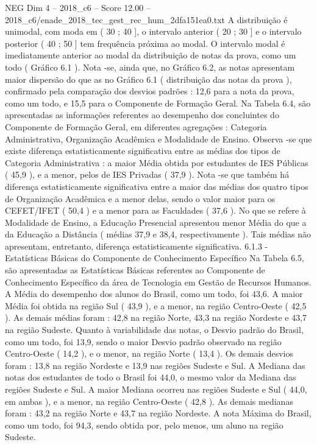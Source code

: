 \begin{textsample}{NEG Dim 4 – 2018\_c6 – Score 12.00 – 2018\_c6/enade\_2018\_tec\_gest\_rec\_hum\_2dfa151ea0.txt}
A distribuição é unimodal, com moda em ( 30 ; 40 ], o intervalo anterior ( 20 ; 30 ] e o intervalo posterior ( 40 ; 50 ] tem frequência próxima ao modal.
O intervalo modal é imediatamente anterior ao modal da distribuição de notas da prova, como um todo ( Gráfico 6.1 ).
Nota -se, ainda que, no Gráfico 6.2, as notas apresentam maior dispersão do que as no Gráfico 6.1 ( distribuição das notas da prova ), confirmado pela comparação dos desvios padrões : 12,6 para a nota da prova, como um todo, e 15,5 para o Componente de Formação Geral.
Na Tabela 6.4, são apresentadas as informações referentes ao desempenho dos concluintes do Componente de Formação Geral, em diferentes agregações : Categoria Administrativa, Organização Acadêmica e Modalidade de Ensino.
Observa -se que existe diferença estatisticamente significativa entre as médias dos tipos de Categoria Administrativa : a maior Média obtida por estudantes de IES Públicas ( 45,9 ), e a menor, pelos de IES Privadas ( 37,9 ).
Nota -se que também há diferença estatisticamente significativa entre a maior das médias dos quatro tipos de Organização Acadêmica e a menor delas, sendo o valor maior para os CEFET/IFET ( 50,4 ) e a menor para as Faculdades ( 37,6 ).
No que se refere à Modalidade de Ensino, a Educação Presencial apresentou menor Média do que a da Educação a Distância ( médias 37,9 e 38,4, respectivamente ).
Tais médias não apresentam, entretanto, diferença estatisticamente significativa. 6.1.3 - Estatísticas Básicas do Componente de Conhecimento Específico Na Tabela 6.5, são apresentadas as Estatísticas Básicas referentes ao Componente de Conhecimento Específico da área de Tecnologia em Gestão de Recursos Humanos.
A Média do desempenho dos alunos do Brasil, como um todo, foi 43,6.
A maior Média foi obtida na região Sul ( 43,9 ), e a menor, na região Centro-Oeste ( 42,5 ).
As demais médias foram : 42,8 na região Norte, 43,3 na região Nordeste e 43,7 na região Sudeste.
Quanto à variabilidade das notas, o Desvio padrão do Brasil, como um todo, foi 13,9, sendo o maior Desvio padrão observado na região Centro-Oeste ( 14,2 ), e o menor, na região Norte ( 13,4 ).
Os demais desvios foram : 13,8 na região Nordeste e 13,9 nas regiões Sudeste e Sul.
A Mediana das notas dos estudantes de todo o Brasil foi 44,0, o mesmo valor da Mediana das regiões Sudeste e Sul.
A maior Mediana ocorreu nas regiões Sudeste e Sul ( 44,0, em ambas ), e a menor, na região Centro-Oeste ( 42,8 ).
As demais medianas foram : 43,2 na região Norte e 43,7 na região Nordeste.
A nota Máxima do Brasil, como um todo, foi 94,3, sendo obtida por, pelo menos, um aluno na região Sudeste.

\end{textsample}
